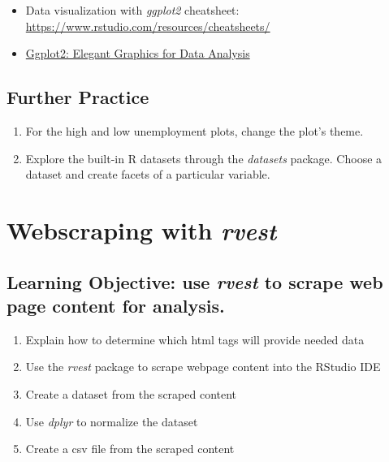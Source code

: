 \documentclass[
  krantz2]{krantz}
\providecommand{\tightlist}{%
  \setlength{\itemsep}{0pt}\setlength{\parskip}{0pt}}
\begin{document}
\begin{itemize}
\tightlist
\item
  Data visualization with \emph{ggplot2} cheatsheet:
  \url{https://www.rstudio.com/resources/cheatsheets/}
\item
  \href{https://ggplot2-book.org/index.html}{Ggplot2: Elegant Graphics for Data Analysis}
\end{itemize}

\hypertarget{ggplot2-practice}{%
\section{Further Practice}\label{ggplot2-practice}}

\begin{enumerate}
\def\labelenumi{\arabic{enumi}.}
\tightlist
\item
  For the high and low unemployment plots, change the plot's theme.
\item
  Explore the built-in R datasets through the \emph{datasets} package. Choose a dataset and create facets of a particular variable.
\end{enumerate}

\hypertarget{rvest}{%
\chapter{\texorpdfstring{Webscraping with \emph{rvest}}{Webscraping with rvest}}\label{rvest}}

\hypertarget{rvest-los}{%
\section{\texorpdfstring{Learning Objective: use \emph{rvest} to scrape web page content for analysis.}{Learning Objective: use rvest to scrape web page content for analysis.}}\label{rvest-los}}

\begin{enumerate}
\def\labelenumi{\arabic{enumi}.}
\tightlist
\item
  Explain how to determine which html tags will provide needed data
\item
  Use the \emph{rvest} package to scrape webpage content into the RStudio IDE
\item
  Create a dataset from the scraped content
\item
  Use \emph{dplyr} to normalize the dataset
\item
  Create a csv file from the scraped content
\end{enumerate}
\end{document}
